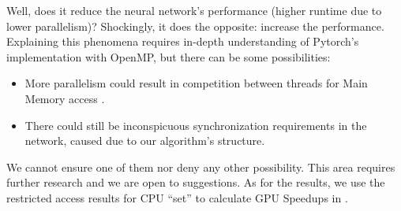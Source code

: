\begin{appendices}
    Well, does it reduce the neural network's performance (higher runtime due to lower parallelism)? Shockingly, it does the opposite: increase the performance. Explaining this phenomena requires in-depth understanding of Pytorch's implementation with OpenMP, but there can be some possibilities:
    \begin{itemize}
        \item More parallelism could result in competition between threads for Main Memory access \cite[Section 2.1]{IssuesMP}.
        \item There could still be inconspicuous synchronization requirements in the network, caused due to our algorithm's structure.
    \end{itemize}
    We cannot ensure one of them nor deny any other possibility. This area requires further research and we are open to suggestions. As for the results, we use the restricted access results for CPU ``set'' to calculate GPU Speedups in .
\end{appendices}